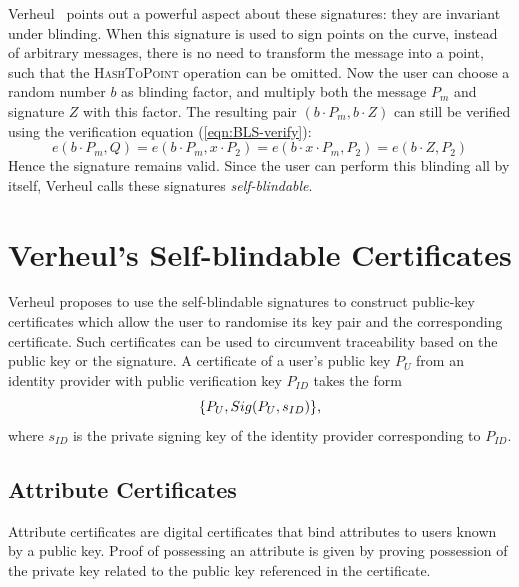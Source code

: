 Verheul~\cite{Verheul01} points out a powerful aspect about these signatures:
they are invariant under blinding. When this signature is used to sign points on
the curve,  instead of arbitrary messages, there is no need to transform the
message into a point, such that the \textsc{HashToPoint} operation can be
omitted. Now the user can choose a random number $b$ as blinding factor, and
multiply both the message $P_m$ and signature $Z$ with this factor. The
resulting pair $(b \cdot P_m, b \cdot Z)$ can still be verified using the
verification equation (\ref{eqn:BLS-verify}):
\begin{equation*}
  e(b \cdot P_m, Q)
  = e(b \cdot P_m, x \cdot P_2)
  = e(b \cdot x \cdot P_m, P_2)
  = e(b \cdot Z, P_2)
\end{equation*}
Hence the signature remains valid. Since the user can perform this blinding all
by itself, Verheul calls these signatures \emph{self-blindable}.

\section{Verheul's Self-blindable Certificates}

Verheul proposes to use the self-blindable signatures to construct public-key
certificates which allow the user to randomise its key pair and the
corresponding certificate. Such certificates can be used to circumvent
traceability based on the public key or the signature. A certificate of a user's
public key $P_U$ from an identity provider with public verification key $P_{ID}$
takes the form
\begin{equation}\label{eqn:sbcert}
  \{ P_U, Sig(P_U, s_{ID}) \}\text,
\end{equation}
where $s_{ID}$ is the private signing key of the identity provider corresponding
to $P_{ID}$.

\subsection{Attribute Certificates}

Attribute certificates are digital certificates that bind attributes to users
known by a public key. Proof of possessing an attribute is given by proving
possession of the private key related to the public key referenced in the
certificate.

